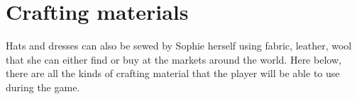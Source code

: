 \section{Crafting materials}
Hats and dresses can also be sewed by Sophie herself using fabric, leather, wool that she can either find or buy at the markets around the world.
Here below, there are all the kinds of crafting material that the player will be able to use during the game.


